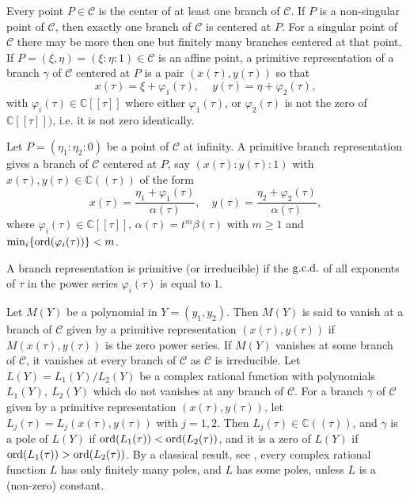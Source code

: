 \documentclass[10pt]{amsart}
\theoremstyle{definition}
\theoremstyle{remark}
\def\cC{\mathcal C}
\begin{document}
Every point $P\in \cC$ is the center of at least one branch of $\cC$. If $P$ is a non-singular point of $\cC$, then exactly one branch of $\cC$ is centered at $P$. For a singular point of $\cC$ there may be more then one but finitely many branches centered at that point. If $P=(\xi,\eta)=(\xi:\eta:1)\in\cC$ is an affine point, a primitive representation of a branch $\gamma$ of $\cC$ centered at $P$ is a pair $(x(\tau),y(\tau))$ so that 
\begin{equation}
\label{eqA20apr}
x(\tau)=\xi+\varphi_1(\tau),\,\quad y(\tau)=\eta+\varphi_2(\tau),
\end{equation}
with $\varphi_i(\tau)\in \mathbb{C}[[\tau]]$ where either  $\varphi_1(\tau)$, or $\varphi_2(\tau)$ is not the zero of $\mathbb{C}[[\tau]])$, i.e. it is not zero identically.

Let $P=(\eta_1:\eta_2:0)$ be a point of $\cC$ at infinity. A primitive branch representation gives a branch of $\cC$ centered at $P$, say 
$(x(\tau):y(\tau):1)$ with $x(\tau),y(\tau)\in \mathbb{C}((\tau))$ of the form
$$x(\tau)=\frac{\eta_1+\varphi_1(\tau)}{\alpha(\tau)},\quad y(\tau)=\frac{\eta_2+\varphi_2(\tau)}{\alpha(\tau)},$$  where $\varphi_i(\tau)\in \mathbb{C}[[\tau]]$, $\alpha(\tau)=t^m \beta(\tau)$ with $m\ge 1$ and $\min_i\{{\rm{ord}}(\varphi_i(\tau))\}<m$.

A branch representation is primitive (or irreducible) if the ${\rm{g.c.d.}}$ of all exponents of $\tau$ in the power series $\varphi_i(\tau)$ is equal to $1$.

Let $M(Y)$ be a polynomial in $Y=(y_1,y_2)$. Then $M(Y)$ is said to vanish at a branch of $\cC$ given by a primitive representation $(x(\tau),y(\tau))$ if $M(x(\tau),y(\tau))$ is the zero power series. If $M(Y)$ vanishes at some branch of $\cC$, it vanishes at every branch of $\cC$ as $\cC$ is irreducible.
Let $L(Y)=L_1(Y)/L_2(Y)$ be a complex rational function with polynomials $L_1(Y),\ L_2(Y)$ which do not vanishes at any branch of $\cC$.
For a branch $\gamma$  of $\cC$ given by a primitive representation $(x(\tau),y(\tau))$, let $L_j(\tau)=L_j(x(\tau),y(\tau))$ with $j=1,2$. Then $L_j(\tau)\in \mathbb{C}((\tau))$, and $\gamma$ is a pole of $L(Y)$ if ${\rm{ord}}(L_1(\tau))<{\rm{ord}}(L_2(\tau))$, and it is a zero of $L(Y)$ if
${\rm{ord}}(L_1(\tau))> {\rm{ord}}(L_2(\tau))$.
By a classical result, see \cite[Theorem 14.1]{seidenberg1968}, every complex rational function $L$
has only finitely many poles, and $L$ has some
poles, unless $L$ is a (non-zero) constant.
\end{document}
